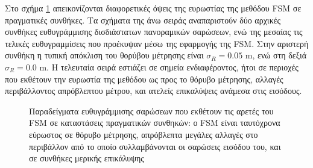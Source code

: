 Στο σχήμα \ref{fig:02_05_04:04} απεικονίζονται διαφορετικές όψεις της ευρωστίας
της μεθόδου FSM σε πραγματικές συνθήκες. Τα σχήματα της άνω σειράς
αναπαριστούν δύο αρχικές συνθήκες ευθυγράμμισης δισδιάστατων πανοραμικών
σαρώσεων, ενώ της μεσαίας τις τελικές ευθυγραμμίσεις που προέκυψαν μέσω της
εφαρμογής της FSM. Στην αριστερή συνθήκη η τυπική απόκλιση του θορύβου
μέτρησης είναι $\sigma_R = 0.05$ m, ενώ στη δεξιά $\sigma_R = 0.0$ m. Η
τελευταία σειρά εστιάζει σε σημεία ενδιαφέροντος, ήτοι σε περιοχές που εκθέτουν
την ευρωστία της μεθόδου ως προς το θόρυβο μέτρησης, αλλαγές περιβάλλοντος
απρόβλεπτου μέτρου, και ατελείς επικαλύψεις ανάμεσα στις εισόδους.

\begin{figure}[]\centering
  
  \vspace{-1cm}
  \caption{\small Παραδείγματα ευθυγράμμισης σαρώσεων που εκθέτουν τις αρετές
           του FSM σε καταστάσεις πραγματικών συνθηκών: ο FSM
           είναι ταυτόχρονα εύρωστος σε θόρυβο μέτρησης, απρόβλεπτα μεγάλες
           αλλαγές στο περιβάλλον από το οποίο συλλαμβάνονται οι σαρώσεις
           εισόδου του, και σε συνθήκες μερικής επικάλυψης}
  \label{fig:02_05_04:04}
\end{figure}
